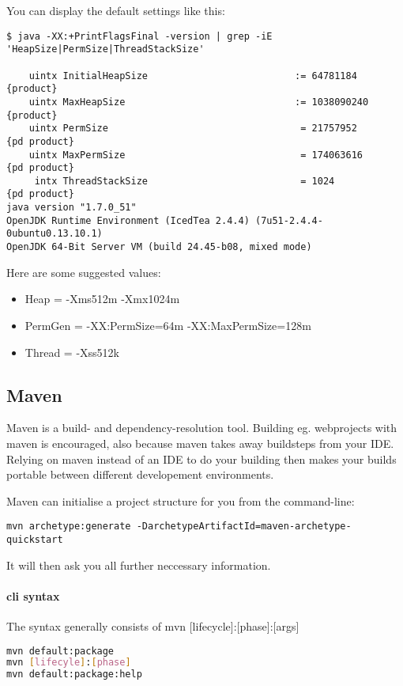You can display the default settings like this: 
\begin{lstlisting}
$ java -XX:+PrintFlagsFinal -version | grep -iE 'HeapSize|PermSize|ThreadStackSize'

    uintx InitialHeapSize                          := 64781184        {product}
    uintx MaxHeapSize                              := 1038090240      {product}
    uintx PermSize                                  = 21757952        {pd product}
    uintx MaxPermSize                               = 174063616       {pd product}
     intx ThreadStackSize                           = 1024            {pd product}
java version "1.7.0_51"
OpenJDK Runtime Environment (IcedTea 2.4.4) (7u51-2.4.4-0ubuntu0.13.10.1)
OpenJDK 64-Bit Server VM (build 24.45-b08, mixed mode)
\end{lstlisting}

Here are some suggested values: 
\begin{itemize}
    \item Heap = -Xms512m -Xmx1024m
    \item PermGen = -XX:PermSize=64m -XX:MaxPermSize=128m
    \item Thread = -Xss512k
\end{itemize}


\subsection{Maven}

Maven is a build- and dependency-resolution tool. Building eg. webprojects with maven is encouraged, also because maven takes away buildsteps from your IDE. Relying on maven instead of an IDE to do your building then makes your builds portable between different developement environments. 

Maven can initialise a project structure for you from the command-line:
\begin{verbatim}
mvn archetype:generate -DarchetypeArtifactId=maven-archetype-quickstart
\end{verbatim} 
It will then ask you all further neccessary information. 

\paragraph{cli syntax} 
The syntax generally consists of mvn [lifecycle]:[phase]:[args]

\begin{lstlisting}[language=bash]
mvn default:package
mvn [lifecyle]:[phase]
mvn default:package:help
\end{lstlisting}
		
